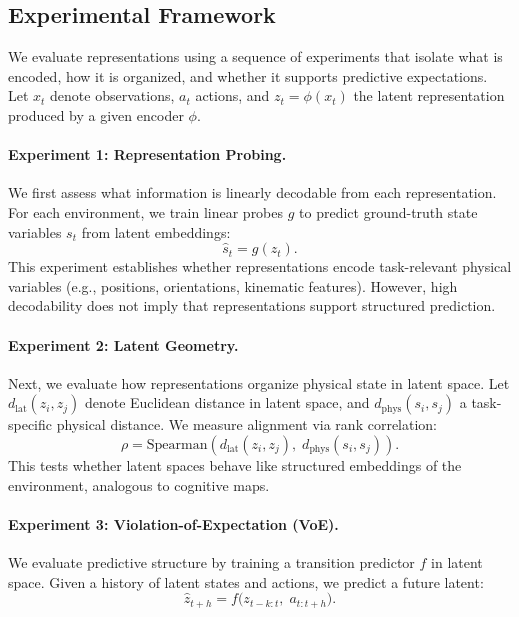 \documentclass[10pt,twocolumn]{article}
\begin{document}
\subsection{Experimental Framework}

We evaluate representations using a sequence of experiments that isolate what is encoded, how it is organized, and whether it supports predictive expectations. Let $x_t$ denote observations, $a_t$ actions, and $z_t = \phi(x_t)$ the latent representation produced by a given encoder $\phi$.

\paragraph{Experiment 1: Representation Probing.}
We first assess what information is linearly decodable from each representation. For each environment, we train linear probes $g$ to predict ground-truth state variables $s_t$ from latent embeddings:
\begin{equation}
\hat{s}_t = g(z_t).
\end{equation}
This experiment establishes whether representations encode task-relevant physical variables (e.g., positions, orientations, kinematic features). However, high decodability does not imply that representations support structured prediction.

\paragraph{Experiment 2: Latent Geometry.}
Next, we evaluate how representations organize physical state in latent space. Let $d_{\text{lat}}(z_i, z_j)$ denote Euclidean distance in latent space, and $d_{\text{phys}}(s_i, s_j)$ a task-specific physical distance. We measure alignment via rank correlation:
\begin{equation}
\rho = \text{Spearman}(d_{\text{lat}}(z_i, z_j),\; d_{\text{phys}}(s_i, s_j)).
\end{equation}
This tests whether latent spaces behave like structured embeddings of the environment, analogous to cognitive maps.

\paragraph{Experiment 3: Violation-of-Expectation (VoE).}
We evaluate predictive structure by training a transition predictor $f$ in latent space. Given a history of latent states and actions, we predict a future latent:
\begin{equation}
\hat{z}_{t+h} = f\big(z_{t-k:t},\; a_{t:t+h}\big).
\end{equation}
\end{document}
